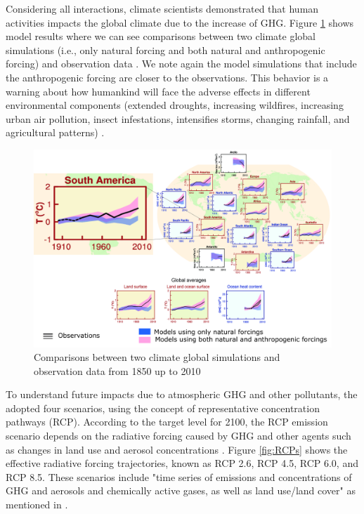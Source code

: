 Considering all interactions, climate scientists demonstrated that human activities impacts the global climate due to the increase of GHG.
Figure \ref{fig:global} shows model results where we can see comparisons between two climate global simulations (i.e., only natural forcing and both natural and anthropogenic forcing) and observation data \citep{IPCC2013}.
We note again the model simulations that include the anthropogenic forcing are closer to the observations.
This behavior is a warning about how humankind will face the adverse effects in different environmental components (extended droughts, increasing wildfires, increasing urban air pollution, insect infestations, intensifies storms, changing rainfall, and agricultural patterns) \citep{Farmer2013}.

\begin{figure}[htb]
  \begin{center}
    \includegraphics[width=16cm]{fig/FigSPM-06.pdf}
  \end{center}
  \caption{Comparisons between two climate global simulations and observation data from 1850 up to 2010  \citep[ilustration adapted from][]{IPCC2013} }
  \label{fig:global}
\end{figure}

To understand future impacts due to atmospheric GHG and other pollutants, the \citet{IPCC2013} adopted four scenarios, using the concept of representative concentration pathways (RCP). 
According to the target level for 2100, the RCP emission scenario depends on the radiative forcing caused by GHG and other agents such as changes in land use and aerosol concentrations \citep{VanVuuren2011a}. 
Figure \ref{fig:RCPs} shows the effective radiative forcing trajectories, known as RCP 2.6, RCP 4.5, RCP 6.0, and RCP 8.5.
These scenarios include "time series of emissions and concentrations of GHG and aerosols and chemically active gases, as well as land use/land cover" as mentioned in \citep[Most et al., 2000; cited in][]{IPCC2013}.

